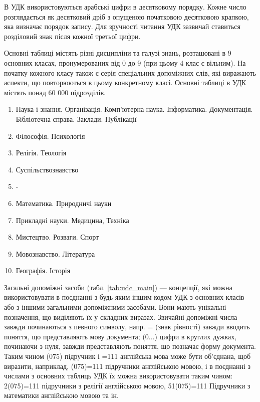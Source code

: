 \documentclass[14pt]{extarticle}
\begin{document}
  В УДК використовуються арабські цифри в десятковому порядку.
  Кожне число розглядається як десятковий дріб
  з опущеною початковою десятковою крапкою, яка визначає порядок запису.
  Для зручності читання УДК зазвичай ставиться розділовий знак
  після кожної третьої цифри.

  Основні таблиці \cite{udc_structure_and_tables} містять різні дисципліни та галузі знань,
  розташовані в 9 основних класах, пронумерованих від 0 до 9
  (при цьому 4 клас є вільним).
  На початку кожного класу також є серія спеціальних допоміжних слів,
  які виражають аспекти, що повторюються в цьому конкретному класі.
  Основні таблиці в УДК містять понад 60 000 підрозділів.
  \begin{enumerate}
      [labelindent=\dimexpr\parindent*2\relax, leftmargin=*, start=0]
    \item Наука і знання.
    Організація.
    Комп'ютерна наука.
    Інформатика.
    Документація.
    Бібліотечна справа.
    Заклади.
    Публікації
    \item Філософія. Психологія
    \item Релігія. Теологія
    \item Суспільствознавство
    \item -
    \item Математика. Природничі науки
    \item Прикладні науки. Медицина, Техніка
    \item Мистецтво. Розваги. Спорт
    \item Мовознавство. Література
    \item Географія. Історія
  \end{enumerate}

  Загальні допоміжні засоби (табл. \ref{tab:udc_main}) — концепції,
  які можна використовувати в поєднанні
  з будь-яким іншим кодом УДК з основних класів
  або з іншими загальними допоміжними засобами.
  Вони мають унікальні позначення, що виділяють їх у складних виразах.
  Звичайні допоміжні числа завжди починаються з певного символу,
  напр. = (знак рівності) завжди вводить поняття,
  що представляють мову документа;
  (0...) цифри в круглих дужках, починаючи з нуля,
  завжди представляють поняття, що позначає форму документа.
  Таким чином (075) підручник і =111 англійська мова може бути об’єднана,
  щоб виразити, наприклад, (075)=111 підручники англійською мовою,
  і в поєднанні з числами з основних таблиць
  УДК їх можна використовувати таким чином:
  2(075)=111 підручники з релігії англійською мовою,
  51(075)=111 Підручники з математики англійською мовою та ін.
\end{document}
